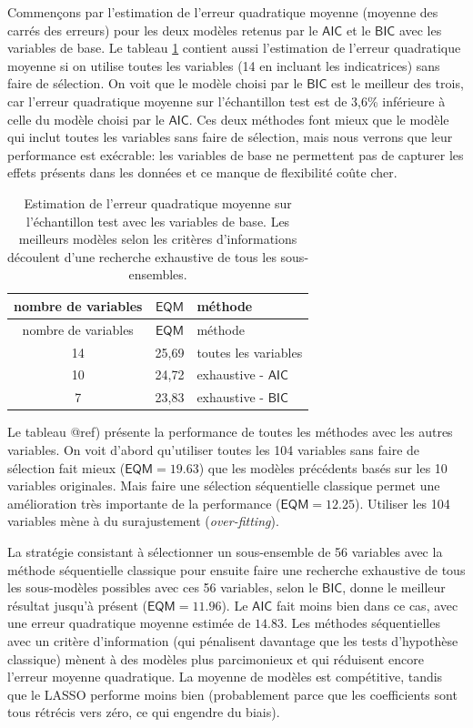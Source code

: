 \documentclass[
  11pt,
  letterpaper,
]{book}
\theoremstyle{definition}
\theoremstyle{definition}
\theoremstyle{definition}
\theoremstyle{remark}
\begin{document}
Commençons par l'estimation de l'erreur quadratique moyenne (moyenne des carrés des erreurs) pour les deux modèles retenus par le \(\mathsf{AIC}\) et le \(\mathsf{BIC}\) avec les variables de base. Le tableau \ref{tab:02-gmse-base} contient aussi l'estimation de l'erreur quadratique moyenne si on utilise toutes les variables (14 en incluant les indicatrices) sans faire de sélection. On voit que le modèle choisi par le \(\mathsf{BIC}\) est le meilleur des trois, car l'erreur quadratique moyenne sur l'échantillon test est de 3,6\% inférieure à celle du modèle choisi par le \(\mathsf{AIC}\). Ces deux méthodes font mieux que le modèle qui inclut toutes les variables sans faire de sélection, mais nous verrons que leur performance est exécrable: les variables de base ne permettent pas de capturer les effets présents dans les données et ce manque de flexibilité coûte cher.

\begin{longtable}[]{@{}ccl@{}}
\caption{\label{tab:02-gmse-base} Estimation de l'erreur quadratique moyenne sur l'échantillon test avec les variables de base. Les meilleurs modèles selon les critères d'informations découlent d'une recherche exhaustive de tous les sous-ensembles.}\tabularnewline
\toprule
nombre de variables & \(\mathsf{EQM}\) & méthode \\
\midrule
\endfirsthead
\toprule
nombre de variables & \(\mathsf{EQM}\) & méthode \\
\midrule
\endhead
14 & 25,69 & toutes les variables \\
10 & 24,72 & exhaustive - \(\mathsf{AIC}\) \\
7 & 23,83 & exhaustive - \(\mathsf{BIC}\) \\
\bottomrule
\end{longtable}

Le tableau @ref\label{tab:02-modelcomparaisonfull}) présente la performance de toutes les méthodes avec les autres variables. On voit d'abord qu'utiliser toutes les 104 variables sans faire de sélection fait mieux (\(\mathsf{EQM}=19.63\)) que les modèles précédents basés sur les 10 variables originales. Mais faire une sélection séquentielle classique permet une amélioration très importante de la performance (\(\mathsf{EQM}=12.25\)). Utiliser les 104 variables mène à du surajustement (\emph{over-fitting}).

La stratégie consistant à sélectionner un sous-ensemble de 56 variables avec la méthode séquentielle classique pour ensuite faire une recherche exhaustive de tous les sous-modèles possibles avec ces 56 variables, selon le \(\mathsf{BIC}\), donne le meilleur résultat jusqu'à présent (\(\mathsf{EQM}=11.96\)). Le \(\mathsf{AIC}\) fait moins bien dans ce cas, avec une erreur quadratique moyenne estimée de \(14.83\).
Les méthodes séquentielles avec un critère d'information (qui pénalisent davantage que les tests d'hypothèse classique) mènent à des modèles plus parcimonieux et qui réduisent encore l'erreur moyenne quadratique. La moyenne de modèles est compétitive, tandis que le LASSO performe moins bien (probablement parce que les coefficients sont tous rétrécis vers zéro, ce qui engendre du biais).
\end{document}
